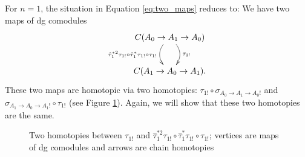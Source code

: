 For $n=1$, the situation in Equation 
\ref{eq:two_maps} reduces to: 
We have two maps of dg comodules
$$
\xymatrix{
C(A_0 \to A_1 \to A_0) 
 \ar@/^1pc/[d]^{\tau_{1!}}
 \ar@/_1pc/[d]_{\hat{\tau}_1^{*2} \tau_{1!}\circ
   \hat{\tau}_1^*\tau_{1!}\circ \tau_{1!}}\\
C(A_1 \to A_0 \to A_1).
}
$$
These two maps are homotopic via 
two homotopies: 
$\tau_{1!} \circ \sigma_{A_0 \to A_1 \to A_0!}$ 
and 
$\sigma_{A_1 \to A_0 \to A_1!} \circ \tau_{1!}$ 
(see Figure \ref{fig:two_homotopies_1}). Again, we will 
show that these two homotopies are the same. 
%
\begin{figure}
\xymatrixcolsep{5pc}
\centerline{}
\caption{Two homotopies between 
$\tau_{1!}$ and $\hat{\tau}_1^{*2} \tau_{1!}\circ
\hat{\tau}_1^*\tau_{1!}\circ \tau_{1!}$;
vertices are maps of dg comodules and 
arrows are chain homotopies}
\label{fig:two_homotopies_1}
\end{figure}
